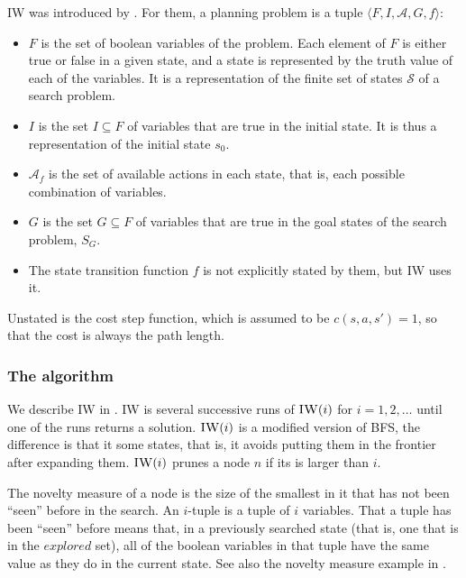 \ac{IW} was introduced by \citet{lipovetzky2012width}. For them, a planning
problem is a tuple $\langle F, I, \mathcal{A}, G, f \rangle$:
\begin{itemize}
  \item $F$ is the set of boolean variables of the problem. Each element of $F$
is either true or false in a given state, and a state is represented by the
truth value of each of the variables. It is a representation of the finite set
of states $\mathcal{S}$ of a search problem.
\item $I$ is the set $I \subseteq F$ of variables that are true in the initial
  state. It is thus a representation of the initial state $s_0$.
\item $\mathcal{A}_f$ is the set of available actions in each state, that is,
  each possible combination of variables.
\item $G$ is the set $G \subseteq F$ of variables that are true in the goal
  states of the search problem, $S_G$.
\item The state transition function $f$ is not explicitly stated by them, but
\ac{IW} uses it.
\end{itemize}
Unstated is the cost step function, which is assumed to be $c(s,a,s') = 1$, so
that the cost is always the path length.

\subsubsection{The algorithm\label{subsec:iw-the-algorithm}}

We describe \ac{IW} in . \ac{IW} is several successive
runs of $\textsc{IW}(i)$ for $i=1,2,\dots$ until one of the runs returns a solution.
$\textsc{IW}(i)$ is a modified version of \ac{BFS}, the difference is that it
 some states, that is, it avoids putting them in the frontier
after expanding them. $\textsc{IW}(i)$ prunes a node $n$ if its  is larger than $i$.

The novelty measure of a node is the size of the smallest 
in it that has not been ``seen'' before in the search. An $i$-tuple is a tuple of
$i$ variables. That a tuple has been ``seen'' before means that, in a previously
searched state (that is, one that is in the $explored$ set), all of the boolean
variables in that tuple have the same value as they do in the current state. See
also the novelty measure example in .

